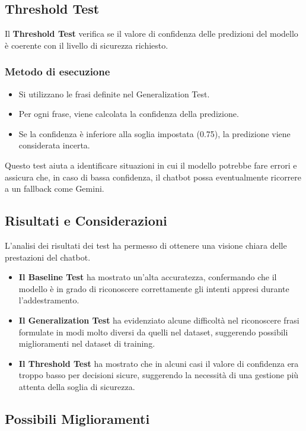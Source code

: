 \documentclass[12pt, letterpaper]{article}
\begin{document}
\subsection{Threshold Test}

Il \textbf{Threshold Test} verifica se il valore di confidenza delle predizioni del modello è coerente con il livello di sicurezza richiesto.

\subsubsection{Metodo di esecuzione}
\begin{itemize}
	\item Si utilizzano le frasi definite nel Generalization Test.
	\item Per ogni frase, viene calcolata la confidenza della predizione.
	\item Se la confidenza è inferiore alla soglia impostata (0.75), la predizione viene considerata incerta.
\end{itemize}
Questo test aiuta a identificare situazioni in cui il modello potrebbe fare errori e assicura che, in caso di bassa confidenza, il chatbot possa eventualmente ricorrere a un fallback come Gemini.

\subsection{Risultati e Considerazioni}

L’analisi dei risultati dei test ha permesso di ottenere una visione chiara delle prestazioni del chatbot.
\begin{itemize}
	\item \textbf{Il Baseline Test} ha mostrato un'alta accuratezza, confermando che il modello è in grado di riconoscere correttamente gli intenti appresi durante l’addestramento.
	\item \textbf{Il Generalization Test} ha evidenziato alcune difficoltà nel riconoscere frasi formulate in modi molto diversi da quelli nel dataset, suggerendo possibili miglioramenti nel dataset di training.
	\item \textbf{Il Threshold Test} ha mostrato che in alcuni casi il valore di confidenza era troppo basso per decisioni sicure, suggerendo la necessità di una gestione più attenta della soglia di sicurezza.
\end{itemize}

\subsection{Possibili Miglioramenti}
\end{document}
